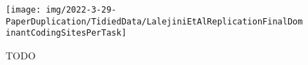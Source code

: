 \begin{figure}
    \centering
    \texttt{[image: img/2022-3-29-PaperDuplication/TidiedData/LalejiniEtAlReplicationFinalDominantCodingSitesPerTask]}
    \caption{TODO} \label{fig:LalejiniEtAlReplicationFinalDominantCodingSitesPerTask}
\end{figure}
